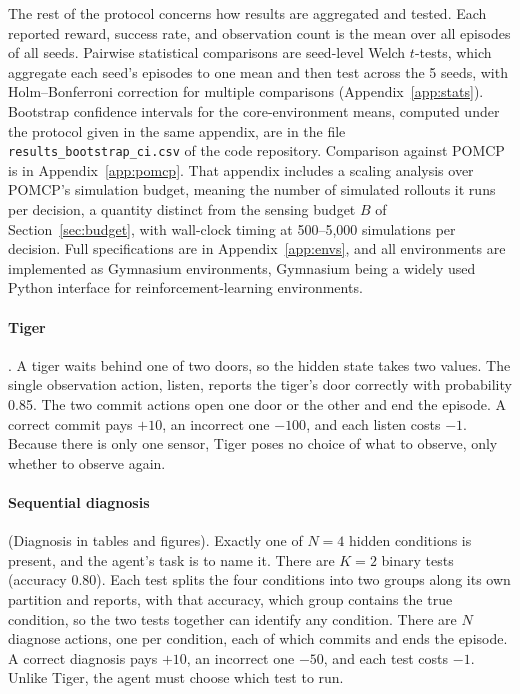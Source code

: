 The rest of the protocol concerns how results are aggregated and tested. Each reported reward, success rate, and observation count is the mean over all episodes of all seeds. Pairwise statistical comparisons are seed-level Welch $t$-tests, which aggregate each seed's episodes to one mean and then test across the 5 seeds, with Holm--Bonferroni correction for multiple comparisons (Appendix~\ref{app:stats}). Bootstrap confidence intervals for the core-environment means, computed under the protocol given in the same appendix, are in the file \texttt{results\_\allowbreak bootstrap\_\allowbreak ci.csv} of the code repository. Comparison against POMCP is in Appendix~\ref{app:pomcp}. That appendix includes a scaling analysis over POMCP's simulation budget, meaning the number of simulated rollouts it runs per decision, a quantity distinct from the sensing budget $B$ of Section~\ref{sec:budget}, with wall-clock timing at 500--5{,}000 simulations per decision. Full specifications are in Appendix~\ref{app:envs}, and all environments are implemented as Gymnasium \citep{towers2024} environments, Gymnasium being a widely used Python interface for reinforcement-learning environments.

\paragraph{Tiger} \citep{kaelbling1998}. A tiger waits behind one of two doors, so the hidden state takes two values. The single observation action, listen, reports the tiger's door correctly with probability 0.85. The two commit actions open one door or the other and end the episode. A correct commit pays $+10$, an incorrect one $-100$, and each listen costs $-1$. Because there is only one sensor, Tiger poses no choice of what to observe, only whether to observe again.

\paragraph{Sequential diagnosis} (Diagnosis in tables and figures). Exactly one of $N{=}4$ hidden conditions is present, and the agent's task is to name it. There are $K{=}2$ binary tests (accuracy 0.80). Each test splits the four conditions into two groups along its own partition and reports, with that accuracy, which group contains the true condition, so the two tests together can identify any condition. There are $N$ diagnose actions, one per condition, each of which commits and ends the episode. A correct diagnosis pays $+10$, an incorrect one $-50$, and each test costs $-1$. Unlike Tiger, the agent must choose which test to run.

